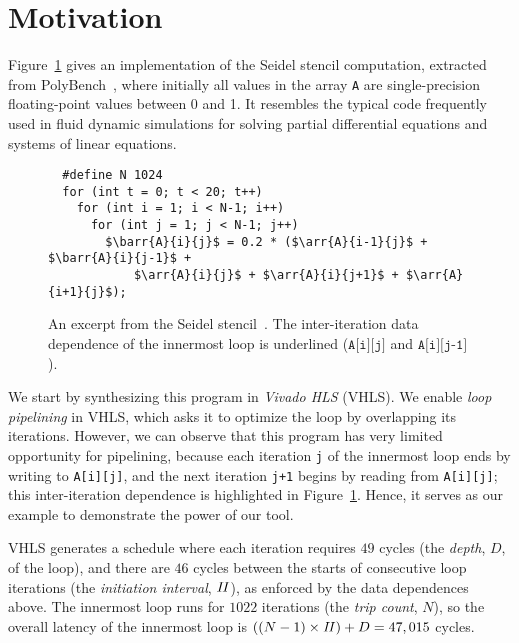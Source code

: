 \section{Motivation}
\label{sec:motivation}

\newcommand\arr[3]{\texttt{#1[#2][#3]}}
\newcommand\barr[3]{\texttt{\underline{#1[#2][#3]}}}

Figure~\ref{fig:seidel_prog} gives an implementation of the Seidel stencil
computation, extracted from PolyBench~\cite{polybench}, where initially all
values in the array \verb|A| are single-precision floating-point values between
0 and 1.  It resembles the typical code frequently used in fluid dynamic
simulations for solving partial differential equations and systems of linear
equations.

\begin{figure}[ht]
\begin{lstlisting}
  #define N 1024
  for (int t = 0; t < 20; t++)
    for (int i = 1; i < N-1; i++)
      for (int j = 1; j < N-1; j++)
        $\barr{A}{i}{j}$ = 0.2 * ($\arr{A}{i-1}{j}$ + $\barr{A}{i}{j-1}$ +
            $\arr{A}{i}{j}$ + $\arr{A}{i}{j+1}$ + $\arr{A}{i+1}{j}$);
\end{lstlisting}
    \caption{%
    An excerpt from the Seidel stencil~\cite{polybench}.  The inter-iteration
    data dependence of the innermost loop is underlined ($\arr{A}{i}{j}$ and
    $\arr{A}{i}{j-1}$).}
    \label{fig:seidel_prog}
\end{figure}

We start by synthesizing this program in \emph{Vivado HLS} (VHLS)\@.  We
enable \emph{loop pipelining} in VHLS, which asks it to optimize the loop by
overlapping its iterations.  However, we can observe that this program has
very limited opportunity for pipelining, because each iteration \verb|j| of
the innermost loop ends by writing to \verb|A[i][j]|, and the next iteration
\verb|j+1| begins by reading from \verb|A[i][j]|; this inter-iteration
dependence is highlighted in Figure~\ref{fig:seidel_prog}.  Hence, it serves as
our example to demonstrate the power of our tool.

VHLS generates a schedule where each iteration requires $49$ cycles (the
\emph{depth}, $D$, of the loop), and there are $46$ cycles between the starts
of consecutive loop iterations (the \emph{initiation interval}, $\mathit{II}$),
as enforced by the data dependences above.  The innermost loop runs for
$1022$ iterations (the \emph{trip count}, $N$), so the overall latency of the
innermost loop is $((N-1) \times \mathit{II}) + D = 47,015$ cycles.

